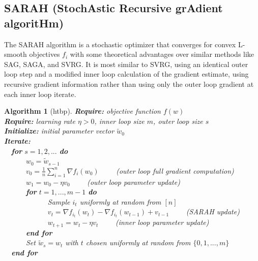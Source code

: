 \documentclass[letterpaper,11 pt]{article}
\newtheorem{algorithm}{Algorithm}
\begin{document}
\subsection{SARAH (StochAstic Recursive grAdient algoritHm) \cite{nguyen}}

The SARAH algorithm is a stochastic optimizer that converges for convex L-smooth objectives $f_{i}$ with some theoretical advantages over similar methods like SAG, SAGA, and SVRG. It is most similar to SVRG, using an identical outer loop step and a modified inner loop calculation of the gradient estimate, using recursive gradient information rather than using only the outer loop gradient at each inner loop iterate.

\begin{algorithm}[htbp]
\caption{The SARAH algorithm is identical to SVRG except for the \textit{SARAH update}, which modifies the stochastic gradient estimate to use recursive gradient estimate information rather than the initialized gradient to update the gradient estimate in the inner loop.}
\label{alg:sarah}

{\bf Require:}  objective function $f(w)$ \\
{\bf Require:} learning rate $\eta>0$, inner loop size $m$, outer loop size $s$ \\
{\bf Initialize:} initial parameter vector $\tilde{w}_{0}$ \\
{\bf Iterate:} \\
\-\ \-\ {\bf for } $s = 1,2,...$ {\bf do} \\
\-\ \-\ \-\ \-\ \-\ \-\  $w_{0} = \tilde{w}_{s-1}$ \\
\-\ \-\ \-\ \-\ \-\ \-\   $v_{0} = \frac{1}{n}\sum_{i=1}^{n}{\nabla f_{i}(w_{0})}$ \-\ \-\ \-\ \-\  (\textit{outer loop full gradient computation}) \\
\-\ \-\ \-\ \-\ \-\ \-\   $w_{1} = w_{0} - \eta v_{0}$ \-\ \-\ \-\ \-\  (\textit{outer loop parameter update})   \\
\-\ \-\ \-\ \-\ \-\ \-\  {\bf for } $t = 1,...,m-1$ {\bf do} \\
\-\ \-\ \-\ \-\ \-\ \-\ \-\ \-\ \-\ \-\ \-\ \-\    Sample $i_{t}$ uniformly at random from $[n]$ \\
\-\ \-\ \-\ \-\ \-\ \-\ \-\ \-\ \-\ \-\ \-\ \-\    $v_{t} =   \nabla f_{i_{t}}(w_{t})  - \nabla f_{i_{t}}(w_{t-1})  + v_{t-1}$    \-\ \-\ \-\ \-\  (\textit{SARAH update})  \\
\-\ \-\ \-\ \-\ \-\ \-\ \-\ \-\ \-\ \-\ \-\ \-\   $w_{t+1} = w_{t} - \eta v_{t} $ \-\ \-\ \-\ \-\  (\textit{inner loop parameter update}) \\
\-\ \-\ \-\ \-\ \-\ \-\ {\bf end for} \\
\-\ \-\ \-\ \-\ \-\ \-\  Set $\tilde{w}_{s} = w_{t}$ with $t$ chosen uniformly at random from $\{0,1,...,m\}$  \\
\-\ \-\ {\bf end for }
\end{algorithm}
\end{document}
